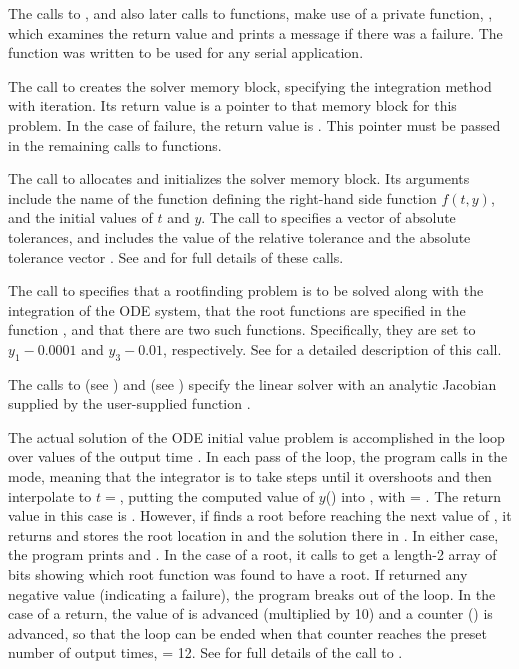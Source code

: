 The calls to , and also later calls to 
functions, make use of a private function, , which examines
the return value and prints a message if there was a failure.  The
 function was written to be used for any serial {\sundials}
application.

The call to  creates the {\cvode} solver memory block,
specifying the  integration method with  iteration.
Its return value is a pointer to that memory block for this
problem.  In the case of failure, the return value is .  This
pointer must be passed in the remaining calls to {\cvode} functions.

The call to  allocates and initializes the solver memory block.
Its arguments include the name of the {\C} function  defining the
right-hand side function $f(t,y)$, and the initial values of $t$ and $y$.
The call to  specifies a vector of absolute tolerances,
and includes the value of the relative tolerance  and the absolute 
tolerance vector .  See  and
 for full details of these calls.

The call to  specifies that a rootfinding problem
is to be solved along with the integration of the ODE system, that the
root functions are specified in the function , and that there are
two such functions.  Specifically, they are set to $y_1 - 0.0001$ and 
$y_3 - 0.01$, respectively.
See  for a detailed description of this call.

The calls to  (see ) and 
 (see ) specify the {\cvdense}
linear solver with an analytic Jacobian supplied by the user-supplied function
.

The actual solution of the ODE initial value problem is accomplished in
the loop over values of the output time .  In each pass of the
loop, the program calls  in the  mode, meaning that
the integrator is to take steps until it overshoots  and then
interpolate to $t = $, putting the computed value of $y$()
into , with  = .  The return value in this case is
.  However, if  finds a root before reaching the next
value of , it returns  and stores the root
location in  and the solution there in .  In either case, the
program prints  and .  In the case of a root, it calls
 to get a length-2 array  of bits showing
which root function was found to have a root.  If  returned any
negative value (indicating a failure), the program breaks out of the loop.  
In the case of a  return, the value of  is
advanced (multiplied by 10) and a counter () is advanced, so
that the loop can be ended when that counter reaches the preset number
of output times,  = 12.  See  for full
details of the call to .

